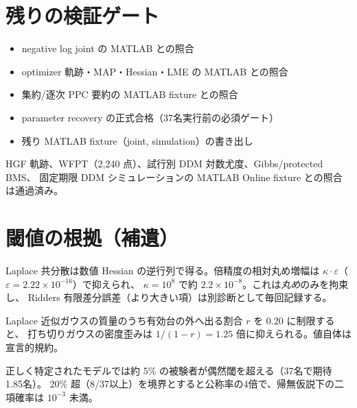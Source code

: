 \documentclass[11pt]{ltjsarticle}
\newcommand{\code}[1]{\texttt{#1}}
\begin{document}
\section{残りの検証ゲート}

\begin{itemize}[leftmargin=1.4em]
  \item[$\square$] negative log joint の MATLAB との照合
  \item[$\square$] optimizer 軌跡・MAP・Hessian・LME の MATLAB との照合
  \item[$\square$] 集約/逐次 PPC 要約の MATLAB fixture との照合
  \item[$\square$] parameter recovery の正式合格（37名実行前の必須ゲート）
  \item[$\square$] 残り MATLAB fixture（joint, simulation）の書き出し
\end{itemize}
HGF 軌跡、WFPT（2{,}240 点）、試行別 DDM 対数尤度、Gibbs/protected BMS、
固定期限 DDM シミュレーションの MATLAB Online fixture との照合は通過済み。

\section{閾値の根拠（補遺）}
\label{sec:threshold}

\begin{description}[leftmargin=0em]
  \item[\code{max\_condition\_number} \(=10^8\)]
    Laplace 共分散は数値 Hessian の逆行列で得る。倍精度の相対丸め増幅は
    \(\kappa\cdot\varepsilon\)（\(\varepsilon=2.22\times10^{-16}\)）で抑えられ、
    \(\kappa=10^8\) で約 \(2.2\times10^{-8}\)。これは\emph{丸め}のみを拘束し、
    Ridders 有限差分誤差（より大きい項）は別診断として毎回記録する。
  \item[\code{max\_rejection\_rate} \(=0.20\)]
    Laplace 近似ガウスの質量のうち有効台の外へ出る割合 \(r\) を 0.20 に制限すると、
    打ち切りガウスの密度歪みは \(1/(1-r)=1.25\) 倍に抑えられる。値自体は宣言的規約。
  \item[systematic deviation の被験者割合 \(=0.20\)]
    正しく特定されたモデルでは約 5\% の被験者が偶然閾を超える（37名で期待 1.85名）。
    20\% 超（8/37以上）を境界とすると公称率の4倍で、帰無仮説下の二項確率は
    \(10^{-3}\) 未満。
\end{description}
\end{document}
